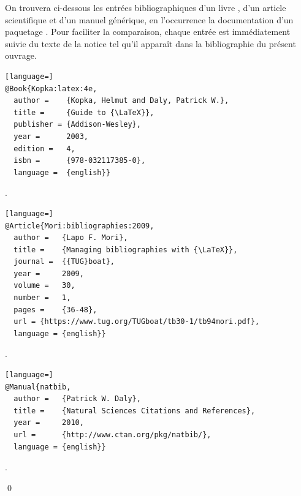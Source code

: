 \begin{exemple}
  \label{ex:bibliographie:bib}
  On trouvera ci-dessous les entrées bibliographiques d'un livre
  \citep{Kopka:latex:4e}, d'un article scientifique
  \citep{Mori:bibliographies:2009} et d'un manuel générique, en
  l'occurrence la documentation d'un paquetage \citep{natbib}. Pour
  faciliter la comparaison, chaque entrée est immédiatement suivie du
  texte de la notice tel qu'il apparaît dans la bibliographie du
  présent ouvrage.

\begin{lstlisting}[language=]
@Book{Kopka:latex:4e,
  author =    {Kopka, Helmut and Daly, Patrick W.},
  title =     {Guide to {\LaTeX}},
  publisher = {Addison-Wesley},
  year =      2003,
  edition =   4,
  isbn =      {978-032117385-0},
  language =  {english}}
\end{lstlisting}

  \begin{framed}
    \noindent {}.
  \end{framed}

\begin{lstlisting}[language=]
@Article{Mori:bibliographies:2009,
  author =   {Lapo F. Mori},
  title =    {Managing bibliographies with {\LaTeX}},
  journal =  {{TUG}boat},
  year =     2009,
  volume =   30,
  number =   1,
  pages =    {36-48},
  url =	{https://www.tug.org/TUGboat/tb30-1/tb94mori.pdf},
  language = {english}}
\end{lstlisting}

  \begin{framed}
    \noindent {}.
  \end{framed}

\begin{lstlisting}[language=]
@Manual{natbib,
  author =   {Patrick W. Daly},
  title =    {Natural Sciences Citations and References},
  year =     2010,
  url =      {http://www.ctan.org/pkg/natbib/},
  language = {english}}
\end{lstlisting}

  \begin{framed}
    \noindent {}.
  \end{framed}
  \qed
\end{exemple}


